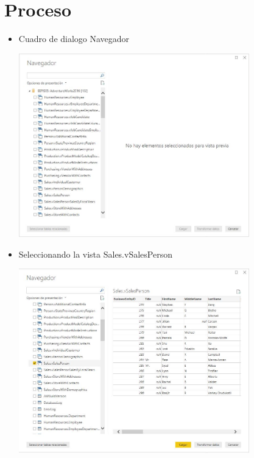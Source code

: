 \section{Proceso} 

\begin{itemize}
	\item Cuadro de dialogo Navegador
	\begin{center}
	\includegraphics[width=10cm]{./Imagenes/Captura1} 
	\end{center}
\end{itemize} 

\begin{itemize}
	\item Seleccionando la vista Sales.vSalesPerson
	\begin{center}
	\includegraphics[width=10cm]{./Imagenes/Captura2} 
	\end{center}
\end{itemize} 

